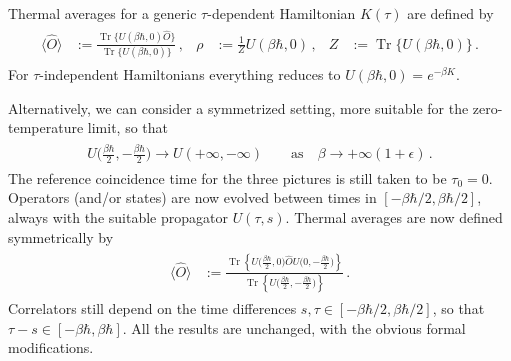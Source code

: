 \documentclass[../QFT_main.tex]{subfiles}
\begin{document}
\begin{mytheorem}
Thermal averages for a generic $\tau$-dependent Hamiltonian $K(\tau)$ are defined by
{\small\begin{align}\label{eq:thermal_avg_time_dep_hamiltonian}
\begin{aligned}
    \langle\widehat{O}\rangle
    &:=
    \tfrac{\operatorname{Tr}\big\{U(\beta\hbar,0)\widehat{O}\big\}}
    {\operatorname{Tr}\big\{U(\beta\hbar,0)\big\}}\,,
    &
    \rho&:=\tfrac{1}{Z}U(\beta\hbar,0)\,,
    &
    Z&:=\operatorname{Tr}\big\{U(\beta\hbar,0)\big\}\,.
\end{aligned}\end{align}}
For $\tau$-independent Hamiltonians everything reduces to $U(\beta\hbar,0)=e^{-\beta K}$.

Alternatively, we can consider a symmetrized setting, more suitable for the zero-temperature limit, so that
{\small\begin{align}\begin{aligned}
    U\big(\tfrac{\beta\hbar}{2},-\tfrac{\beta\hbar}{2}\big)
    \longrightarrow U(+\infty,-\infty)\qquad \text{as}\quad \beta \to +\infty(1+\epsilon)\,.
\end{aligned}\end{align}}
The reference coincidence time for the three pictures is still taken to be $\tau_0=0$.
Operators (and/or states) are now evolved between times in $[-\beta\hbar/2,\beta\hbar/2]$, always with the suitable propagator $U(\tau,s)$.
Thermal averages are now defined symmetrically by
{\small\begin{align}\label{eq:symmetric_thermal_avg}
\begin{aligned}
    \langle\widehat{O}\rangle
    &:=
    \tfrac{
        \operatorname{Tr}\left\{
            U\big(\tfrac{\beta\hbar}{2},0\big)
            \widehat{O}
            U\big(0,-\tfrac{\beta\hbar}{2}\big)
        \right\}
    }{
        \operatorname{Tr}\left\{
            U\big(\tfrac{\beta\hbar}{2},-\tfrac{\beta\hbar}{2}\big)
        \right\}
    }\,.
\end{aligned}\end{align}}
Correlators still depend on the time differences $s,\tau\in[-\beta\hbar/2,\beta\hbar/2]$, so that $\tau-s\in[-\beta\hbar,\beta\hbar]$.
All the results are unchanged, with the obvious formal modifications.
\end{mytheorem}
\end{document}
